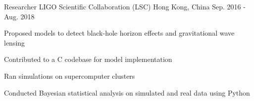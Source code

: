 \begin{cventries}
  \cventry
    {Researcher} %
    {LIGO Scientific Collaboration (LSC)} %
    {Hong Kong, China} %
    {Sep. 2016 - Aug. 2018} %
    {
      \begin{cvitems} %
        \item{Proposed models to detect black-hole horizon effects and gravitational wave lensing}
        \item{Contributed to a C codebase for model implementation}
        \item{Ran simulations on supercomputer clusters}
        \item{Conducted Bayesian statistical analysis on simulated and real data using Python}
      \end{cvitems}
    }

\end{cventries}
